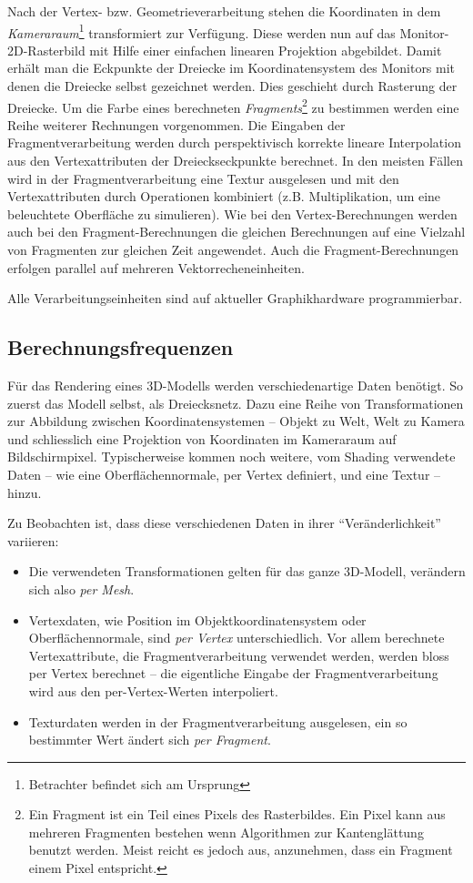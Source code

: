 \documentclass[twoside,a4paper,fleqn,12pt]{article}
\begin{document}
Nach der Vertex- bzw. Geometrieverarbeitung stehen die Koordinaten in dem \emph{Kameraraum}\footnote{Betrachter befindet sich am
Ursprung} transformiert zur Verfügung. Diese werden nun auf das Monitor-2D-Rasterbild mit Hilfe einer einfachen linearen Projektion
abgebildet. Damit erhält man die Eckpunkte der Dreiecke im Koordinatensystem des Monitors mit denen die Dreiecke selbst
gezeichnet werden. Dies geschieht durch Rasterung der Dreiecke. Um die Farbe eines berechneten 
\emph{Fragments}\footnote{Ein Fragment ist ein Teil eines Pixels des Rasterbildes. Ein Pixel kann aus mehreren Fragmenten bestehen wenn 
Algorithmen zur Kantenglättung benutzt werden. Meist reicht es jedoch aus, anzunehmen, dass ein Fragment einem Pixel entspricht.} zu 
bestimmen werden eine Reihe weiterer Rechnungen vorgenommen. Die Eingaben der Fragmentverarbeitung werden
durch perspektivisch korrekte lineare Interpolation aus den Vertexattributen der Drei\-ecks\-eck\-punk\-te  
berechnet. In den meisten Fällen wird in der Fragmentverarbeitung eine Textur ausgelesen
und mit den Vertexattributen durch Operationen kombiniert (z.B. Multiplikation, um eine beleuchtete Oberfläche zu simulieren).
Wie bei den Vertex-Berechnungen werden auch bei den Fragment-Berechnungen die gleichen Berechnungen auf eine Vielzahl
von Fragmenten zur gleichen Zeit angewendet. Auch die Fragment-Berechnungen erfolgen parallel auf mehreren Vektorrecheneinheiten.

Alle Verarbeitungseinheiten sind auf aktueller Graphikhardware programmierbar.

\subsection{Berechnungsfrequenzen}
\label{berechnungsfrequenz_locker}

Für das Rendering eines 3D-Modells werden verschiedenartige Daten benötigt. So zuerst das Modell selbst, als Dreiecksnetz. Dazu
eine Reihe von Transformationen zur Abbildung zwischen Koordinatensystemen -- Objekt zu Welt, Welt zu Kamera und schliesslich
eine Projektion von Koordinaten im Kameraraum auf Bildschirmpixel. Typischerweise kommen noch weitere, vom Shading verwendete Daten --
wie eine Oberflächennormale, per Vertex definiert, und eine Textur -- hinzu.

Zu Beobachten ist, dass diese verschiedenen Daten in ihrer "`Veränderlichkeit"' variieren:
\begin{itemize}
\item Die verwendeten Transformationen gelten für das ganze 3D-Modell, verändern sich also \emph{per Mesh}.
\item Vertexdaten, wie Position im Objektkoordinatensystem oder Oberflächennormale, sind \emph{per Vertex}
unterschiedlich. Vor allem berechnete Vertexattribute, die Fragmentverarbeitung verwendet werden, werden
bloss per Vertex berechnet -- die eigentliche Eingabe der Fragmentverarbeitung wird aus den per-Vertex-Werten
interpoliert.
\item Texturdaten werden in der Fragmentverarbeitung ausgelesen, ein so bestimmter Wert ändert sich \emph{per Fragment}.
\end{itemize}
\end{document}
